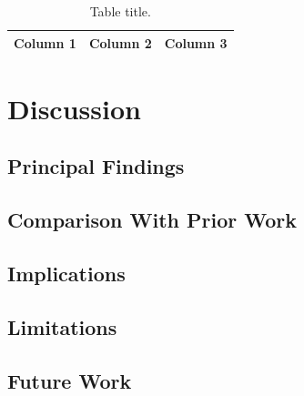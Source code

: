 \documentclass[Afour,sagev,times]{sagej}
\begin{document}

\begin{table}[ht]
\footnotesize\sf
\centering
\caption{Table title.\label{tab:table1}}
\begin{tabular}{lll}
\hline
\textbf{Column 1} & \textbf{Column 2} & \textbf{Column 3} \\
\hline
\hline
\end{tabular}
\end{table}

\section{Discussion}


\subsection{Principal Findings}


\subsection{Comparison With Prior Work}


\subsection{Implications}


\subsection{Limitations}


\subsection{Future Work}
\end{document}
